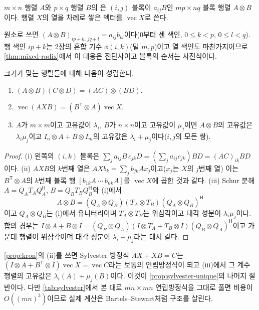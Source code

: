\begin{definition}[Kronecker 곱]
\label{def:kron}
$m\times n$ 행렬 $A$와 $p\times q$ 행렬 $B$의 은 $(i,j)$ 블록이 $a_{ij}B$인 $mp\times nq$ 블록 행렬 $A\otimes B$이다. 행렬 $X$의 열을 차례로 쌓은 벡터를 $\operatorname{vec}X$로 쓴다.
\end{definition}

원소로 쓰면 $(A\otimes B)_{ip+k,\,jq+l}=a_{ij}b_{kl}$이다($0$부터 센 색인, $0\le k<p$, $0\le l<q$). 행 색인 $ip+k$는 2장의 혼합 기수 $\phi(i,k)$(밑 $m,p$)이고 열 색인도 마찬가지이므로 \cref{thm:mixed-radix}에서 이 대응은 전단사이고 블록의 순서는 사전식이다.

\begin{proposition}
\label{prop:kron}
크기가 맞는 행렬들에 대해 다음이 성립한다.
\begin{enumerate}
\item $(A\otimes B)(C\otimes D)=(AC)\otimes(BD)$.
\item $\operatorname{vec}(AXB)=(B^{\mathsf T}\otimes A)\operatorname{vec}X$.
\item $A$가 $m\times m$이고 고유값이 $\lambda_i$, $B$가 $n\times n$이고 고유값이 $\mu_j$이면 $A\otimes B$의 고유값은 $\lambda_i\mu_j$이고 $I_n\otimes A+B\otimes I_m$의 고유값은 $\lambda_i+\mu_j$이다($i,j$의 모든 쌍).
\end{enumerate}
\end{proposition}

\begin{proof}
(i) 왼쪽의 $(i,k)$ 블록은 $\sum_ja_{ij}B\,c_{jk}D=(\sum_ja_{ij}c_{jk})BD=(AC)_{ik}BD$이다. (ii) $AXB$의 $k$번째 열은 $AXb_k=\sum_jb_{jk}Ax_j$이고($x_j$는 $X$의 $j$번째 열) 이는 $B^{\mathsf T}\otimes A$의 $k$번째 블록 행 $[b_{1k}A\ \cdots\ b_{nk}A]$를 $\operatorname{vec}X$에 곱한 것과 같다. (iii) Schur 분해 $A=Q_AT_AQ_A^{\mathsf H}$, $B=Q_BT_BQ_B^{\mathsf H}$와 (i)에서
\[
A\otimes B=(Q_A\otimes Q_B)(T_A\otimes T_B)(Q_A\otimes Q_B)^{\mathsf H}
\]
이고 $Q_A\otimes Q_B$는 (i)에서 유니터리이며 $T_A\otimes T_B$는 위삼각이고 대각 성분이 $\lambda_i\mu_j$이다. 합의 경우는 $I\otimes A+B\otimes I=(Q_B\otimes Q_A)(I\otimes T_A+T_B\otimes I)(Q_B\otimes Q_A)^{\mathsf H}$이고 가운데 행렬이 위삼각이며 대각 성분이 $\lambda_i+\mu_j$라는 데서 같다.
\end{proof}

\cref{prop:kron}의 (ii)를 쓰면 Sylvester 방정식 $AX+XB=C$는 $(I\otimes A+B^{\mathsf T}\otimes I)\operatorname{vec}X=\operatorname{vec}C$라는 보통의 연립방정식이 되고 (iii)에서 그 계수행렬의 고유값은 $\lambda_i(A)+\mu_j(B)$이다. 이것이 \cref{prop:sylvester-unique}의 나머지 절반이다. 다만 \cref{tab:sylvester}에서 본 대로 $mn\times mn$ 연립방정식을 그대로 풀면 비용이 $O((mn)^3)$이므로 실제 계산은 Bartels--Stewart처럼 구조를 살린다.

